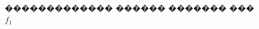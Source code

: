 \documentclass[a4paper]{article}
\begin{document}
\begin{figure}[h]
\begin{minipage}[h]{0.49\linewidth}
  \end{minipage}
  \caption{������������� ������ ������� ��� $f_1$}
  \label{d3beg}
\end{figure}

\begin{figure}[h]
  \begin{minipage}[h]{0.49\linewidth}
  \end{minipage}
  \hfill
  \begin{minipage}[h]{0.49\linewidth}

\end{minipage}
\end{figure}
\end{document}
